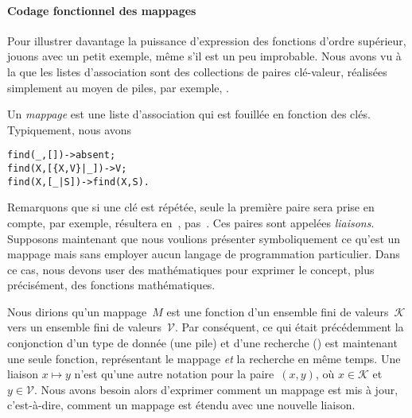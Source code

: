 \paragraph{Codage fonctionnel des mappages}

Pour illustrer davantage la puissance d'expression des fonctions
d'ordre supérieur, jouons avec un petit exemple, même s'il est un peu
improbable. Nous avons vu à la  que
les listes d'association sont des collections de paires clé-valeur,
réalisées simplement au moyen de piles, par exemple,
\erlcode{[\{a,0\},\{b,1\},\{a,5\}]}.

Un \emph{mappage} est une liste d'association qui est fouillée en
fonction des clés. Typiquement, nous avons
\begin{alltt}
find(_,       []) -> absent;
find(X,[\{X,V\}|\_]) -> V;\hfill% \emph{Valeur associée trouvée}
find(X,    [\_|S]) -> find(X,S).\hfill% \emph{La recherche continue}
\end{alltt}
Remarquons que si une clé est répétée, seule la première paire sera
prise en compte, par exemple,
 résultera en~,
pas~. Ces paires sont appelées \emph{liaisons}. Supposons
maintenant que nous voulions présenter symboliquement ce qu'est un
mappage mais sans employer aucun langage de programmation
particulier. Dans ce cas, nous devons user des mathématiques pour
exprimer le concept, plus précisément, des fonctions
mathématiques.

Nous dirions qu'un mappage~\(M\) est une fonction d'un ensemble fini
de valeurs~\(\mathcal{K}\) vers un ensemble fini de
valeurs~\(\mathcal{V}\). Par conséquent, ce qui était précédemment la
conjonction d'un type de donnée (une pile) et d'une recherche
() est maintenant une seule fonction, représentant le
mappage \emph{et} la recherche en même temps. Une liaison \(x \mapsto
y\) n'est qu'une autre notation pour la paire~\((x, y)\), où \(x \in
\mathcal{K}\) et \(y \in \mathcal{V}\). Nous avons besoin alors
d'exprimer comment un mappage est mis à jour, c'est-à-dire, comment un
mappage est étendu avec une nouvelle liaison.

